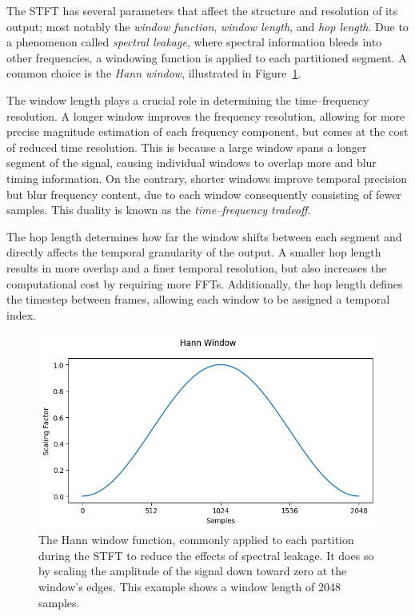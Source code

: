 The \gls{STFT} has several parameters that affect the structure and resolution of its output; most notably the \textit{window function}, \textit{window length}, and \textit{hop length}. Due to a phenomenon called \textit{spectral leakage}, where spectral information bleeds into other frequencies, a windowing function is applied to each partitioned segment. A common choice is the \textit{Hann window}, illustrated in Figure~\ref{HannWindowFigure}.

The window length plays a crucial role in determining the time–frequency resolution. A longer window improves the frequency resolution, allowing for more precise magnitude estimation of each frequency component, but comes at the cost of reduced time resolution. This is because a large window spans a longer segment of the signal, causing individual windows to overlap more and blur timing information. On the contrary, shorter windows improve temporal precision but blur frequency content, due to each window consequently consisting of fewer samples. This duality is known as the \textit{time–frequency tradeoff}.

The hop length determines how far the window shifts between each segment and directly affects the temporal granularity of the output. A smaller hop length results in more overlap and a finer temporal resolution, but also increases the computational cost by requiring more \glspl{FFT}. Additionally, the hop length defines the timestep between frames, allowing each window to be assigned a temporal index.

\begin{figure}[H]
    \centering
    \includegraphics[scale=0.8]{figures/hann}
    \caption{The Hann window function, commonly applied to each partition during the \gls{STFT} to reduce the effects of spectral leakage. It does so by scaling the amplitude of the signal down toward zero at the window's edges. This example shows a window length of 2048 samples.}
    \label{HannWindowFigure}
\end{figure}

